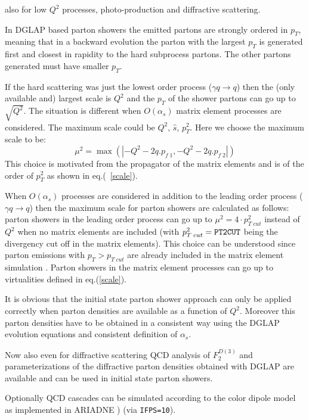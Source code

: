 \documentclass[10pt]{article} \usepackage{dina4}
\begin{document}
also for low $Q^2$ processes, photo-production  and diffractive scattering.
\par
In DGLAP based parton showers the emitted partons are strongly 
ordered in $p_T$, meaning that in a backward evolution the parton 
with the largest $p_T$ is generated first and closest in rapidity to the hard 
subprocess partons. The other partons generated must have smaller $p_T$.
\par
If the hard scattering was just the lowest order process 
($\gamma q \rightarrow q$) then the (only available and) largest scale is
$Q^2$ and the $p_T$ of the shower partons can go up to $\sqrt{Q^2}$. 
The situation is different when $O(\alpha_s)$ matrix element processes are
considered. The maximum scale could be $Q^2$, $\hat{s}$, $p_T^2$. Here we 
choose the maximum scale to be:
\begin{equation}
\mu^2 = \max(|-Q^2 - 2q.p_{f\;1},-Q^2 - 2q.p_{f\;2}|)
\end{equation}
This choice \cite{MEPS} is motivated from the propagator of the matrix 
elements and is of the order of $p_T^2$ as shown in eq.(~\ref{scale}).
\par
When $O(\alpha_s)$ processes are considered in addition to the 
leading order process ($\gamma q \rightarrow q$) then the maximum scale
for parton showers are calculated as follows: parton showers in the
leading order process can go up to $\mu^2 = 4 \cdot p_{T\;cut}^2$ instead of
$Q^2$ when no matrix elements are included (with $ p_{T\;cut}^2 =
\verb+PT2CUT+$ being the divergency cut off in the matrix elements). 
This choice can be understood since parton emissions with $p_T > p_{T\;cut}$
are already included in the matrix element simulation \cite{MEPS}.
Parton showers in the matrix element processes can go up to 
virtualities defined in eq.(\ref{scale}).
\par
It is obvious that the initial state parton shower 
approach can only be applied correctly
when parton densities are available as a function of $Q^2$. Moreover this
parton densities have to be obtained in a consistent way using the
DGLAP evolution equations and consistent definition of $\alpha_s$.
\par
Now also even for diffractive scattering QCD analysis of $F_2^{D(3)}$
 and parameterizations of the diffractive parton densities 
obtained with DGLAP are available and can be used in initial state 
parton showers.
\par
Optionally QCD cascades can be simulated according to the 
color dipole model as implemented in
ARIADNE \cite{CDM}) (via \verb+IFPS=10+).
\end{document}
